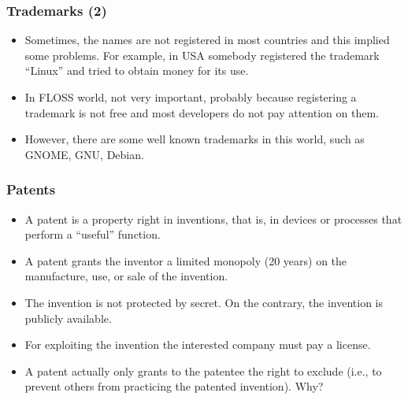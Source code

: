 
\begin{frame}
\frametitle{Trademarks (2)}

\begin{itemize}
\item Sometimes, the names are not registered in most countries and this
implied some problems. {\small For example, in USA somebody registered the
trademark ``Linux'' and tried to obtain money for its use.}
\item In FLOSS world, not very important, probably because
registering a trademark is not free and most developers do not pay
attention on them. 
\item However, there are some well known trademarks in
this world, such as GNOME, GNU, Debian.
\end{itemize}

\end{frame}




\begin{frame}
\frametitle{Patents}

\begin{itemize}
\item A patent is a property right in \alert{inventions}, that is, in devices or
processes that perform a ``useful'' function.
\item A patent grants the inventor a limited \alert{monopoly} (20 years) on the
manufacture, use, or sale of the invention. 
\item The invention is not protected by secret. On the contrary, the
  invention is publicly available.
\item For exploiting the invention the interested company must pay a license.
\item A patent actually only grants to the patentee the right \alert{to exclude} (i.e., to prevent others from practicing the patented invention). Why?
\end{itemize}

\end{frame}


